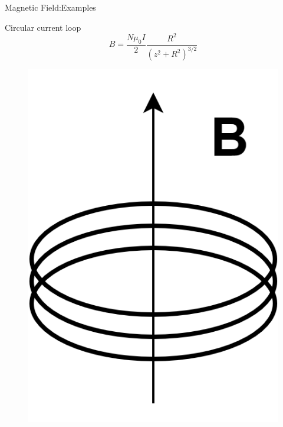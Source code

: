 \documentclass{beamer}
\begin{document}
\begin{frame}{Magnetic Field:Examples}
    \begin{beamerboxesrounded}{Circular current loop}
        \begin{equation}
            B = \frac{N\mu_0I}{2} \frac{R^2}{(z^2+R^2)^{3/2}}
        \end{equation}
    \end{beamerboxesrounded}
    \vfill
    \begin{figure}[htbp]
        \centering
        \includegraphics[scale=0.8]{images/loop.png}
    \end{figure}
\end{frame}
\end{document}
